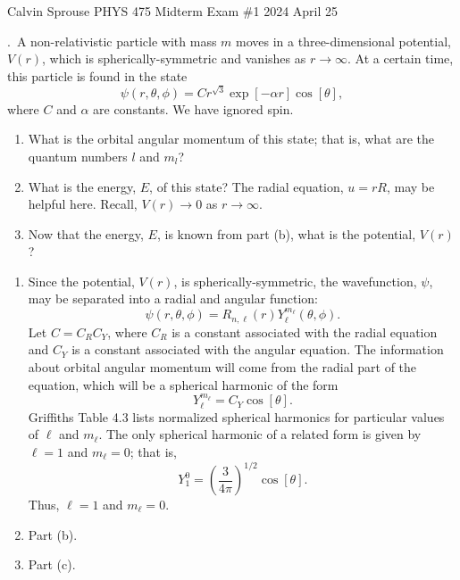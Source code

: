 \documentclass[a4paper, 12pt]{config/homework}
\begin{document}
\noindent
\hfill Calvin Sprouse \hfill PHYS 475 Midterm Exam \#1 \hfill 2024 April 25 \hfill
\bigskip

\bigskip{}.\ A non-relativistic particle with mass \(m\) moves in a three-dimensional potential, \(V(r)\), which is spherically-symmetric and vanishes as \(r\to\infty\). At a certain time, this particle is found in the state
\[\psi(r,\theta,\phi) = Cr^{\sqrt{3}}\exp\left[-\alpha r\right]\cos\left[\theta\right],\]
where \(C\) and \(\alpha\) are constants. We have ignored spin.
\begin{enumerate}[label=(\alph*)]
\item What is the orbital angular momentum of this state; that is, what are the quantum numbers \(l\) and \(m_l\)?
\item What is the energy, \(E\), of this state? The radial equation, \(u=rR\), may be helpful here. Recall, \(V(r)\to0\) as \(r\to\infty\).
\item Now that the energy, \(E\), is known from part (b), what is the potential, \(V(r)\)?
\end{enumerate}
\bigskip
\begin{enumerate}[label=(\alph*)]
\item Since the potential, \(V(r)\), is spherically-symmetric, the wavefunction, \(\psi\), may be separated into a radial and angular function:
\[\psi(r,\theta,\phi)=R_{n,\ell}(r)Y_\ell^{m_\ell}(\theta,\phi).\]
Let \(C=C_R C_Y\), where \(C_R\) is a constant associated with the radial equation and \(C_Y\) is a constant associated with the angular equation. The information about orbital angular momentum will come from the radial part of the equation, which will be a spherical harmonic of the form
\[Y_\ell^{m_\ell} = C_Y \cos\left[\theta\right].\]
Griffiths Table 4.3 lists normalized spherical harmonics for particular values of \(\ell\) and \(m_\ell\). The only spherical harmonic of a related form is given by \(\ell=1\) and \(m_\ell=0\); that is,
\[Y_1^0=\left(\frac{3}{4\pi}\right)^{1/2}\cos\left[\theta\right].\]
Thus, \(\ell=1\) and \(m_\ell=0\).

\pagebreak
\item Part (b).


\pagebreak
\item Part (c).


\end{enumerate}
\end{document}

